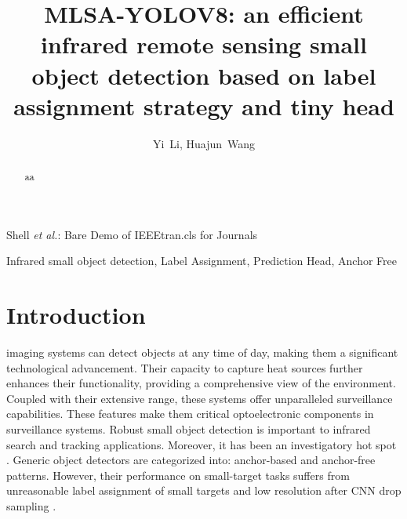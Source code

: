 \documentclass[journal]{IEEEtran}
\begin{document}
\title{MLSA-YOLOV8: an efficient infrared remote sensing small object detection based on label assignment strategy and tiny head}
\author{Yi~Li, Huajun~Wang}

\markboth{}%
{Shell \MakeLowercase{\textit{et al.}}: Bare Demo of IEEEtran.cls for Journals}

\maketitle

\begin{abstract}
aa
\end{abstract}

\begin{IEEEkeywords}
Infrared small object detection, Label Assignment, Prediction Head, Anchor Free
\end{IEEEkeywords}

\IEEEpeerreviewmaketitle

\section{Introduction}

 imaging systems can detect objects at any time of day, making them a significant technological advancement. Their capacity to capture heat sources further enhances their functionality, providing a comprehensive view of the environment. Coupled with their extensive range, these systems offer unparalleled surveillance capabilities. These features make them critical optoelectronic components in surveillance systems\cite{dai2023one}. Robust small object detection is important to infrared search and tracking applications. Moreover, it has been an investigatory hot spot \cite{zhao2022single}. Generic object detectors are categorized into: anchor-based and anchor-free patterns. However, their performance on small-target tasks suffers from unreasonable label assignment of small targets and low resolution after CNN drop sampling
\cite{xu2022rfla}.

\end{document}
